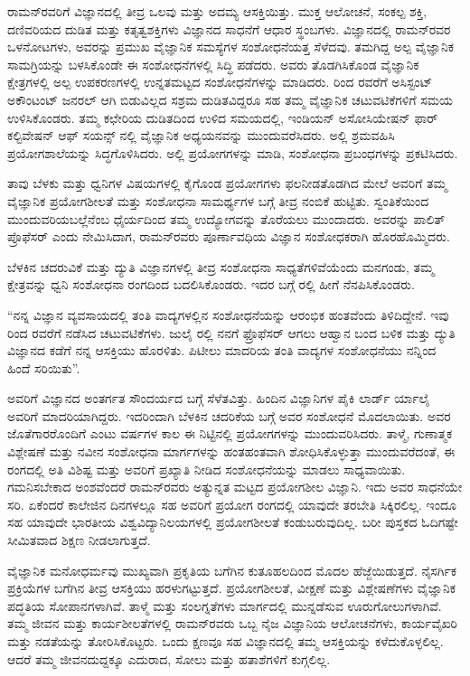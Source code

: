ರಾಮನ್‍ರವರಿಗೆ ವಿಜ್ಞಾನದಲ್ಲಿ ತೀವ್ರ ಒಲವು ಮತ್ತು ಅದಮ್ಯ ಆಸಕ್ತಿಯಿತ್ತು. ಮುಕ್ತ ಆಲೋಚನೆ, ಸಂಕಲ್ಪ ಶಕ್ತಿ, ದಣಿವರಿಯದ ದುಡಿತ ಮತ್ತು ಕತೃತ್ವಶಕ್ತಿಗಳು ವಿಜ್ಞಾನದ ಸಾಧನೆಗೆ ಆಧಾರ ಸ್ಥಂಬಗಳು. ವಿಜ್ಞಾನದಲ್ಲಿ ರಾಮನ್‍ರವರ ಒಳನೋಟಗಳು, ಅವರನ್ನು ಪ್ರಮುಖ ವೈಜ್ಞಾನಿಕ ಸಮಸ್ಯೆಗಳ ಸಂಶೋಧನೆಯತ್ತ ಸೆಳೆದವು. ತಮಗಿದ್ದ ಅಲ್ಪ ವೈಜ್ಞಾನಿಕ ಸಾಮಗ್ರಿಯನ್ನು ಬಳಸಿಕೊಂಡೇ ಈ ಸಂಶೋಧನೆಗಳಲ್ಲಿ ಸಿದ್ಧಿ ಪಡೆದರು. ಅವರು ತೊಡಗಿಸಿಕೊಂಡ ವೈಜ್ಞಾನಿಕ ಕ್ಷೇತ್ರಗಳಲ್ಲಿ ಅಲ್ಪ ಉಪಕರಣಗಳಲ್ಲಿ ಉನ್ನತಮಟ್ಟದ ಸಂಶೋಧನೆಗಳನ್ನು ಮಾಡಿದರು.  ರಿಂದ ರವರೆಗೆ ಅಸಿಸ್ಟಂಟ್ ಅಕೌಂಟಂಟ್ ಜನರಲ್ ಆಗಿ ಬಿಡುವಿಲ್ಲದ ಸಶ್ರಮ ದುಡಿತವಿದ್ದರೂ ಸಹ ತಮ್ಮ ವೈಜ್ಞಾನಿಕ ಚಟುವಟಿಕೆಗಳಿಗೆ ಸಮಯ ಉಳಿಸಿಕೊಂಡರು. ತಮ್ಮ ಕಛೇರಿಯ ದುಡಿತದಿಂದ ಉಳಿದ ಸಮಯದಲ್ಲಿ, ಇಂಡಿಯನ್ ಅಸೋಸಿಯೇಷನ್ ಫಾರ್ ಕಲ್ಟಿವೇಷನ್ ಆಫ್ ಸಯನ್ಸ್ ನಲ್ಲಿ ವೈಜ್ಞಾನಿಕ ಅಧ್ಯಯನವನ್ನು ಮುಂದುವರೆಸಿದರು. ಅಲ್ಲಿ ಶ್ರಮವಹಿಸಿ ಪ್ರಯೋಗಶಾಲೆಯನ್ನು ಸಿದ್ಧಗೊಳಿಸಿದರು. ಅಲ್ಲಿ ಪ್ರಯೋಗಗಳನ್ನು ಮಾಡಿ, ಸಂಶೋಧನಾ ಪ್ರಬಂಧಗಳನ್ನು ಪ್ರಕಟಿಸಿದರು.

ತಾವು ಬೆಳಕು ಮತ್ತು ಧ್ವನಿಗಳ ವಿಷಯಗಳಲ್ಲಿ ಕೈಗೊಂಡ ಪ್ರಯೋಗಗಳು ಫಲನೀಡತೊಡಗಿದ ಮೇಲೆ ಅವರಿಗೆ ತಮ್ಮ ವೈಜ್ಞಾನಿಕ ಪ್ರಯೋಗಶೀಲತೆ ಮತ್ತು ಸಂಶೋಧನಾ ಸಾಮರ್ಥ್ಯಗಳ ಬಗ್ಗೆ ತೀವ್ರ ನಂಬಿಕೆ ಹುಟ್ಟಿತು. ಸ್ವಂತಿಕೆಯಿಂದ ಮುಂದುವರಿಯಬಲ್ಲೆನೆಂಬ ಧೈರ್ಯದಿಂದ ತಮ್ಮ ಉದ್ಯೋಗವನ್ನು ತೊರೆಯಲು ಮುಂದಾದರು. ಅವರನ್ನು ಪಾಲಿತ್ ಪ್ರೊಫೆಸರ್ ಎಂದು ನೇಮಿಸಿದಾಗ, ರಾಮನ್‍ರವರು ಪೂರ್ಣಾವಧಿಯ ವಿಜ್ಞಾನ ಸಂಶೋಧಕರಾಗಿ ಹೊರಹೊಮ್ಮಿದರು.

ಬೆಳಕಿನ ಚದರುವಿಕೆ ಮತ್ತು ದ್ಯುತಿ ವಿಜ್ಞಾನಗಳಲ್ಲಿ ತೀವ್ರ ಸಂಶೋಧನಾ ಸಾಧ್ಯತೆಗಳಿವೆಯೆಂದು ಮನಗಂಡು, ತಮ್ಮ ಕ್ಷೇತ್ರವನ್ನು ಧ್ವನಿ ಸಂಶೋಧನಾ ರಂಗದಿಂದ ಬದಲಿಸಿಕೊಂಡರು. ಇದರ ಬಗ್ಗೆ ರಲ್ಲಿ ಹೀಗೆ ನೆನಪಿಸಿಕೊಂಡರು.

“ನನ್ನ ವಿಜ್ಞಾನ ವ್ಯವಸಾಯದಲ್ಲಿ ತಂತಿ ವಾದ್ಯಗಳಲ್ಲಿನ ಸಂಶೋಧನೆಯನ್ನು ಆರಂಭಿಕ ಹಂತವೆಂದು ತಿಳಿದಿದ್ದೇನೆ. ಇವು  ರಿಂದ  ರವರೆಗೆ ನಡೆಸಿದ ಚಟುವಟಿಕೆಗಳು. ಜುಲೈ ರಲ್ಲಿ ನನಗೆ ಫ್ರೊಫೆಸರ್ ಆಗಲು ಆಹ್ವಾನ ಬಂದ ಬಳಿಕ ಮತ್ತು ದ್ಯುತಿ ವಿಜ್ಞಾನದ ಕಡೆಗೆ ನನ್ನ ಆಸಕ್ತಿಯು ಹೊರಳಿತು. ಪಿಟೀಲು ಮಾದರಿಯ ತಂತಿ ವಾದ್ಯಗಳ ಸಂಶೋಧನೆಯು ನನ್ನಿಂದ ಹಿಂದೆ ಸರಿಯಿತು”.

ಅವರಿಗೆ ವಿಜ್ಞಾನದ ಅಂತರ್ಗತ ಸೌಂದರ್ಯದ ಬಗ್ಗೆ ಸೆಳೆತವಿತ್ತು. ಹಿಂದಿನ ವಿಜ್ಞಾನಿಗಳ ಪೈಕಿ ಲಾರ್ಡ್ ರ್ಯಾಲೈ ಅವರಿಗೆ ಮಾದರಿಯಾಗಿದ್ದರು. ಇದರಿಂದಾಗಿ ಬೆಳಕಿನ ಚದರಿಕೆಯ ಬಗ್ಗೆ ಅವರ ಸಂಶೋಧನೆ ಮೊದಲಾಯಿತು. ಅವರ ಜೊತೆಗಾರರೊಂದಿಗೆ ಎಂಟು ವರ್ಷಗಳ ಕಾಲ ಈ ನಿಟ್ಟಿನಲ್ಲಿ ಪ್ರಯೋಗಗಳನ್ನು ಮುಂದುವರಿಸಿದರು. ತಾಳ್ಮೆ, ಗುಣಾತ್ಮಕ ವಿಶ್ಲೇಷಣೆ ಮತ್ತು ನವೀನ ಸಂಶೋಧನಾ ಮಾರ್ಗಗಳನ್ನು ಹಂತಹಂತವಾಗಿ ಶೋಧಿಸಿಕೊಳ್ಳುತ್ತಾ ಮುಂದುವರೆದಂತೆ, ಈ ರಂಗದಲ್ಲಿ ಅತಿ ವಿಶಿಷ್ಟ ಮತ್ತು ಅವರಿಗೆ ಪ್ರಖ್ಯಾತಿ ನೀಡಿದ ಸಂಶೋಧನೆಯನ್ನು ಮಾಡಲು ಸಾಧ್ಯವಾಯಿತು. ಗಮನಿಸಬೇಕಾದ ಅಂಶವೆಂದರೆ ರಾಮನ್‍ರವರು ಅತ್ಯುನ್ನತ ಮಟ್ಟದ ಪ್ರಯೋಗಶೀಲ ವಿಜ್ಞಾನಿ. ಇದು ಅವರ ಸಾಧನೆಯೇ ಸರಿ. ಏಕೆಂದರೆ ಕಾಲೇಜಿನ ದಿನಗಳಲ್ಲೂ ಸಹ ಅವರಿಗೆ ಪ್ರಯೋಗ ರಂಗದಲ್ಲಿ ಯಾವುದೇ ತರಬೇತಿ ಸಿಕ್ಕಿರಲಿಲ್ಲ. ಇಂದೂ ಸಹ ಯಾವುದೇ ಭಾರತೀಯ ವಿಶ್ವವಿದ್ಯಾನಿಲಯಗಳಲ್ಲಿ ಪ್ರಯೋಗಶೀಲತೆ ಕಂಡುಬರುವುದಿಲ್ಲ. ಬರೀ ಪುಸ್ತಕದ ಓದಿಗಷ್ಟೇ ಸೀಮಿತವಾದ ಶಿಕ್ಷಣ ನೀಡಲಾಗುತ್ತದೆ.

ವೈಜ್ಞಾನಿಕ ಮನೋಧರ್ಮವು ಮುಖ್ಯವಾಗಿ ಪ್ರಕೃತಿಯ ಬಗೆಗಿನ ಕುತೂಹಲದಿಂದ ಮೊದಲ ಹೆಜ್ಜೆಯಿಡುತ್ತದೆ. ನೈಸರ್ಗಿಕ ಪ್ರಕ್ರಿಯೆಗಳ ಬಗೆಗಿನ ತೀವ್ರ ಆಸಕ್ತಿಯು ಹರಳುಗಟ್ಟುತ್ತದೆ. ಪ್ರಯೋಗಶೀಲತೆ, ವೀಕ್ಷಣೆ ಮತ್ತು ವಿಶ್ಲೇಷಣೆಗಳು ವೈಜ್ಞಾನಿಕ ಪದ್ಧತಿಯ ಸೋಪಾನಗಳಾಗಿವೆ. ತಾಳ್ಮೆ ಮತ್ತು ಸಂಲಗ್ನತೆಗಳು ಮಾರ್ಗದಲ್ಲಿ ಮುನ್ನಡೆಸುವ ಊರುಗೋಲುಗಳಾಗಿವೆ. ತಮ್ಮ ಜೀವನ ಮತ್ತು ಕಾರ್ಯಶೀಲತೆಗಳಲ್ಲಿ ರಾಮನ್‍ರವರು ಒಬ್ಬ ನೈಜ ವಿಜ್ಞಾನಿಯ ಆಲೋಚನೆಗಳು, ಕಾರ್ಯವೈಖರಿ ಮತ್ತು ನಡತೆಯನ್ನು ತೋರಿಸಿಕೊಟ್ಟರು. ಒಂದು ಕ್ಷಣವೂ ಸಹ ವಿಜ್ಞಾನದಲ್ಲಿ ತಮ್ಮ ಆಸಕ್ತಿಯನ್ನು ಕಳೆದುಕೊಳ್ಳಲಿಲ್ಲ. ಆದರೆ ತಮ್ಮ ಜೀವನದುದ್ದಕ್ಕೂ ಎದುರಾದ, ಸೋಲು ಮತ್ತು ಹತಾಶೆಗಳಿಗೆ ಕುಗ್ಗಲಿಲ್ಲ.

